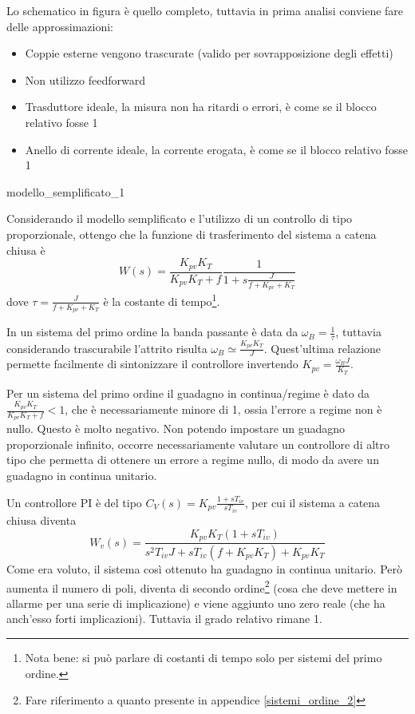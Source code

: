 Lo schematico in figura è quello completo, tuttavia in prima analisi conviene fare delle approssimazioni:
\begin{itemize}
    \item Coppie esterne vengono trascurate (valido per sovrapposizione degli effetti)
    \item Non utilizzo feedforward
    \item Trasduttore ideale, la misura non ha ritardi o errori, è come se il blocco relativo fosse 1
    \item Anello di corrente ideale, la corrente erogata, è come se il blocco relativo fosse 1
\end{itemize}

{modello_semplificato_1}

Considerando il modello semplificato e l'utilizzo di un controllo di tipo proporzionale, ottengo che la funzione di trasferimento del sistema a catena chiusa è 
\[W(s)=\frac{K_{pv}K_T}{K_{pv}K_T+f}\frac{1}{1+s\frac{J}{f+K_{pv}+K_T}}\]
dove \(\tau = \frac{J}{f+K_{pv}+K_T}\) è la costante di tempo\footnote{Nota bene: si può parlare di costanti di tempo solo per sistemi del primo ordine.}.

In un sistema del primo ordine la banda passante è data da \(\omega_B=\frac{1}{\tau}\), tuttavia considerando trascurabile l'attrito risulta \(\omega_B\simeq \frac{K_{pv}K_T}{J}\). Quest'ultima relazione permette facilmente di sintonizzare il controllore invertendo \(K_{pv}=\frac{\omega_B J}{K_T}\).

Per un sistema del primo ordine il guadagno in continua/regime è dato da \(\frac{K_{pv}K_T}{K_{pv}K_T+f}<1\), che è necessariamente minore di 1, ossia l'errore a regime non è nullo. Questo è molto negativo. Non potendo impostare un guadagno proporzionale infinito, occorre necessariamente valutare un controllore di altro tipo che permetta di ottenere un errore a regime nullo, di modo da avere un guadagno in continua unitario.

Un controllore PI è del tipo \(C_V(s)=K_{pv}\frac{1+sT_{iv}}{sT_{iv}}\), per cui il sistema a catena chiusa diventa 
\[W_v(s)=\frac{K_{pv}K_T(1+sT_{iv})}{s^2T_{iv}J + sT_{iv}(f+K_{pv}K_T)+K_{pv}K_T}\]
Come era voluto, il sistema così ottenuto ha guadagno in continua unitario.
Però aumenta il numero di poli, diventa di secondo ordine\footnote{Fare riferimento a quanto presente in appendice \ref{sistemi_ordine_2}} (cosa che deve mettere in allarme per una serie di implicazione) e viene aggiunto uno zero reale (che ha anch'esso forti implicazioni). Tuttavia il grado relativo rimane 1.

